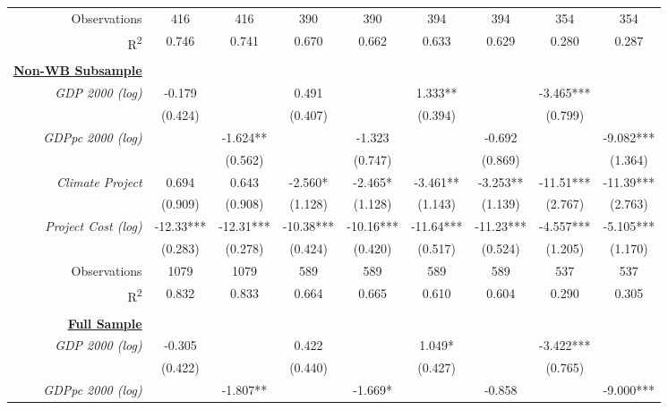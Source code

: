 \documentclass{article}
\begin{document}
\begin{singlespace}
\begin{table}[H]
{\begin{tabular}{rcccccccc}
			Observations & 416 & 416 & 390 & 390 & 394 & 394 & 354 & 354 \\
			R\textsuperscript{2} & 0.746 & 0.741 & 0.670 & 0.662 & 0.633 & 0.629 & 0.280 & 0.287 \\ \hline
			\multicolumn{1}{l}{} & \multicolumn{1}{l}{} & \multicolumn{1}{l}{} & \multicolumn{1}{l}{} & \multicolumn{1}{l}{} & \multicolumn{1}{l}{} & \multicolumn{1}{l}{} & \multicolumn{1}{l}{} & \multicolumn{1}{l}{} \\
			{\ul \textbf{Non-WB Subsample}} &  &  &  &  &  &  &  &  \\
			\textit{GDP 2000 (log)} & -0.179 &  & 0.491 &  & 1.333** &  & -3.465*** &  \\
			\textit{} & (0.424) &  & (0.407) &  & (0.394) &  & (0.799) &  \\
			\textit{GDPpc 2000 (log)} &  & -1.624** &  & -1.323 &  & -0.692 &  & -9.082*** \\
			\textit{} &  & (0.562) &  & (0.747) &  & (0.869) &  & (1.364) \\
			\textit{Climate Project} & 0.694 & 0.643 & -2.560* & -2.465* & -3.461** & -3.253** & -11.51*** & -11.39*** \\
			\textit{} & (0.909) & (0.908) & (1.128) & (1.128) & (1.143) & (1.139) & (2.767) & (2.763) \\
			\textit{Project Cost (log)} & -12.33*** & -12.31*** & -10.38*** & -10.16*** & -11.64*** & -11.23*** & -4.557*** & -5.105*** \\
			\textit{} & (0.283) & (0.278) & (0.424) & (0.420) & (0.517) & (0.524) & (1.205) & (1.170) \\ \hline
			Observations & 1079 & 1079 & 589 & 589 & 589 & 589 & 537 & 537 \\
			R\textsuperscript{2} & 0.832 & 0.833 & 0.664 & 0.665 & 0.610 & 0.604 & 0.290 & 0.305 \\ \hline
			\multicolumn{1}{l}{} & \multicolumn{1}{l}{} & \multicolumn{1}{l}{} & \multicolumn{1}{l}{} & \multicolumn{1}{l}{} & \multicolumn{1}{l}{} & \multicolumn{1}{l}{} & \multicolumn{1}{l}{} & \multicolumn{1}{l}{} \\
			{\ul \textbf{Full Sample}} &  &  &  &  &  &  &  &  \\
			\textit{GDP 2000 (log)} & -0.305 &  & 0.422 &  & 1.049* &  & -3.422*** &  \\
			\textit{} & (0.422) &  & (0.440) &  & (0.427) &  & (0.765) &  \\
			\textit{GDPpc 2000 (log)} &  & -1.807** &  & -1.669* &  & -0.858 &  & -9.000*** \\

\end{tabular}}
\end{table}
\end{singlespace}
\end{document}
